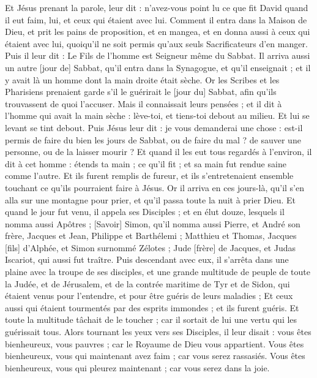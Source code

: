 \begin{multicols}{2}
Et Jésus prenant la parole, leur dit : n'avez-vous point lu ce que fit David quand il eut faim, lui, et ceux qui étaient avec lui.
Comment il entra dans la Maison de Dieu, et prit les pains de proposition, et en mangea, et en donna aussi à ceux qui étaient avec lui, quoiqu'il ne soit permis qu'aux seuls Sacrificateurs d'en manger.
Puis il leur dit : Le Fils de l'homme est Seigneur même du Sabbat.
Il arriva aussi un autre [jour de] Sabbat, qu'il entra dans la Synagogue, et qu'il enseignait ; et il y avait là un homme dont la main droite était sèche.
Or les Scribes et les Pharisiens prenaient garde s'il le guérirait le [jour du] Sabbat, afin qu'ils trouvassent de quoi l'accuser.
Mais il connaissait leurs pensées ; et il dit à l'homme qui avait la main sèche : lève-toi, et tiens-toi debout au milieu. Et lui se levant se tint debout.
Puis Jésus leur dit : je vous demanderai une chose : est-il permis de faire du bien les jours de Sabbat, ou de faire du mal ? de sauver une personne, ou de la laisser mourir ?
Et quand il les eut tous regardés à l'environ, il dit à cet homme : étends ta main ; ce qu'il fit ; et sa main fut rendue saine comme l'autre.
Et ils furent remplis de fureur, et ils s'entretenaient ensemble touchant ce qu'ils pourraient faire à Jésus.
Or il arriva en ces jours-là, qu'il s'en alla sur une montagne pour prier, et qu'il passa toute la nuit à prier Dieu.
Et quand le jour fut venu, il appela ses Disciples ; et en élut douze, lesquels il nomma aussi Apôtres ;
[Savoir] Simon, qu'il nomma aussi Pierre, et André son frère, Jacques et Jean, Philippe et Barthélemi ;
Matthieu et Thomas, Jacques [fils] d'Alphée, et Simon surnommé Zélotes ;
Jude [frère] de Jacques, et Judas Iscariot, qui aussi fut traître.
Puis descendant avec eux, il s'arrêta dans une plaine avec la troupe de ses disciples, et une grande multitude de peuple de toute la Judée, et de Jérusalem, et de la contrée maritime de Tyr et de Sidon, qui étaient venus pour l'entendre, et pour être guéris de leurs maladies ;
Et ceux aussi qui étaient tourmentés par des esprits immondes ; et ils furent guéris.
Et toute la multitude tâchait de le toucher ; car il sortait de lui une vertu qui les guérissait tous.
Alors tournant les yeux vers ses Disciples, il leur disait : vous êtes bienheureux, vous pauvres ; car le Royaume de Dieu vous appartient.
Vous êtes bienheureux, vous qui maintenant avez faim ; car vous serez rassasiés. Vous êtes bienheureux, vous qui pleurez maintenant ; car vous serez dans la joie.

\end{multicols}
